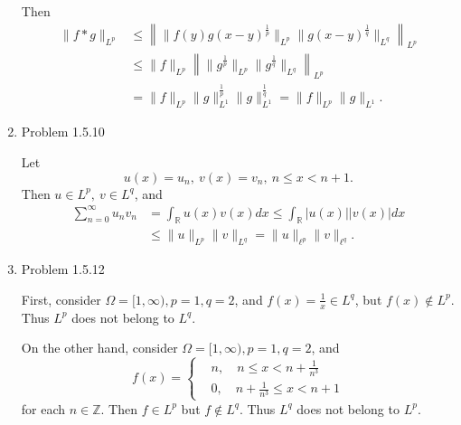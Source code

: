 \documentclass{article}%
\begin{document}
\begin{enumerate}
Then
\begin{equation}
\begin{aligned}
\lVert f\ast g\rVert_{L^p} &\le \left\lVert \lVert f(y)g(x-y)^\frac{1}{p}\rVert_{L^p}\lVert g(x-y)^\frac{1}{q}\rVert_{L^q} \right\rVert_{L^p}  \\
&\le \lVert f\rVert_{L^p} \left\lVert\lVert g^\frac{1}{p}\rVert_{L^p} \lVert g^{\frac{1}{q}}\rVert_{L^q} \right\lVert_{L^p} \\
&= \lVert f\rVert_{L^p} \lVert g\rVert_{L^1}^\frac{1}{p} \lVert g\rVert_{L^1}^\frac{1}{q}  = \lVert f\rVert_{L^p} \lVert g\rVert_{L^1}.
\end{aligned}
\end{equation}

\item Problem 1.5.10

Let
\begin{equation}
u(x) = u_n, \ v(x) = v_n,  \ n \le x < n+1.
\end{equation}
Then $u \in L^p, \ v\in L^q $, and 
\begin{equation}
\begin{aligned}
\sum_{n=0}^{\infty}u_nv_n &= \int_{\mathbb{R}} u(x)v(x)dx \le \int_{\mathbb{R}} |u(x)| |v(x)| dx \\
&\le \lVert u\rVert_{L^p}\lVert v\rVert_{L^q} = \lVert u\rVert_{\ell^p}\lVert v\rVert_{\ell^q}.
\end{aligned}
\end{equation}

\item Problem 1.5.12

First, consider $\Omega = [1, \infty), p = 1, q = 2$, and
$f(x) = \frac{1}{x} \in L^q $, but $f(x)\notin L^p $. Thus $L^p $ does not belong to $L^q $.

On the other hand, consider $\Omega = [1, \infty), p = 1, q = 2 $, and 
\begin{equation}
f(x) = \left\{
\begin{aligned}
&n, \quad n\le x < n+\frac{1}{n^3} \\
&0, \quad n+\frac{1}{n^3} \le x < n+1
\end{aligned}
\right.
\end{equation}
for each $n\in\mathbb{Z}$. Then $f\in L^p $ but $f\notin L^q $. Thus $L^q $ does not belong to $L^p $.

\end{enumerate}
\end{document}
